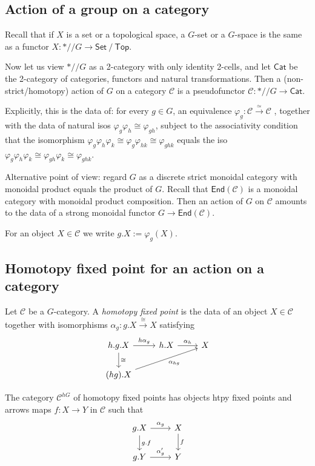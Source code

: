 \documentclass[11pt]{article}
\newcommand{\C}{\mathcal{C}}
\theoremstyle{definition}
\begin{document}
\subsection{Action of a group on  a category}


Recall that if $X$ is a set or a topological space, a $G$-set or a $G$-space is the same as a functor $X: * /\!\!/ G  \to \mathsf{Set} \ / \ \mathsf{Top}$.

Now let us view $* /\!\!/ G$ as a 2-category with only identity 2-cells, and let $\mathsf{Cat}$ be the 2-category of categories, functors and natural transformations. Then a (non-strict/homotopy) action of $G$ on a category $\C$ is a pseudofunctor $\C : * /\!\!/ G \to \mathsf{Cat}$.


Explicitly, this is the data of: for every $g \in G$, an equivalence $\varphi_g: \C \overset{\simeq}{\to} \C$ , together with the data of natural isos $\varphi_g \varphi_h \cong \varphi_{gh}$, subject to the associativity condition that the isomorphism $\varphi_g \varphi_h \varphi_k \cong \varphi_g \varphi_{hk} \cong \varphi_{ghk}$ equals the iso $\varphi_g \varphi_h \varphi_k \cong \varphi_{gh} \varphi_{k} \cong \varphi_{ghk}$.


Alternative point of view: regard $G$ as a discrete strict monoidal category with monoidal product equals the product of $G$. Recall that $\mathsf{End}(\C)$ is a monoidal category with monoidal product composition. Then an action of $G$ on $\C$ amounts to the data of a strong monoidal functor $G \to \mathsf{End}(\C)$.

For an object $X \in \C$ we write $g.X := \varphi_g(X)$.

\subsection{Homotopy fixed point for an action on a category}


Let $\C$ be a $G$-category. A \textit{homotopy fixed point} is the data of an object $X \in \C$ together with isomorphisms $\alpha_g : g.X \overset{\cong}{\to} X$ satisfying
$$
\begin{tikzcd}
    h.g.X \rar{h \alpha_g} \dar{\cong} & h.X \rar{\alpha_h} & X\\
    (hg).X \arrow{urr}[swap]{\alpha_{hg}}
\end{tikzcd}
$$


The category $\C^{hG}$ of homotopy fixed points has objects htpy fixed points and  arrows maps $f:X \to Y$ in $\C$ such that
$$
\begin{tikzcd}
    g.X \rar{\alpha_g} \dar{g.f} & X \dar{f} \\
    g.Y \rar{\alpha'_g} & Y
\end{tikzcd}
$$
\end{document}
